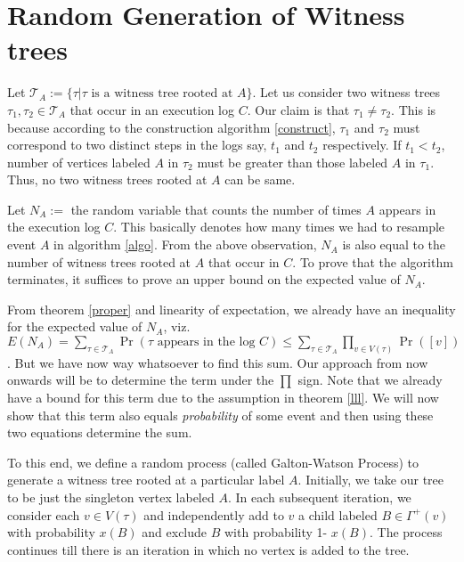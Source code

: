 \section{Random Generation of Witness trees}
Let $\mathcal{T}_A := \{\tau|\tau \text{ is a witness tree rooted at }A\} $. Let us consider two witness trees $\tau_1,\tau_2\in \mathcal{T}_A$ that occur in an execution log $C$. Our claim is that $\tau_1\neq\tau_2$. This is because according to the construction algorithm \ref{construct}, $\tau_1$ and $\tau_2$ must correspond to two distinct steps in the logs say, $t_1$ and  $t_2$ respectively. If $t_1 < t_2$, number of vertices labeled $A$ in $\tau_2$ must be greater than those labeled $A$ in $\tau_1$. Thus, no two witness trees rooted at $A$ can be same.

Let $N_A:=$ the random variable that counts the number of times $A$ appears in the execution log $C$. This basically denotes how many times we had to resample event $A$ in algorithm \ref{algo}. From the above observation, $N_A$ is also equal to the number of witness trees rooted at $A$ that occur in $C$. To prove that the algorithm terminates, it suffices to prove an upper bound on the expected value of $N_A$.

From theorem \ref{proper} and linearity of expectation, we already have an inequality for the expected value of $N_A$, viz. $E(N_A) = \sum\limits_{\tau\in\mathcal{T}_A} \Pr(\tau\text{ appears in the log }C) \leq \sum\limits_{\tau\in\mathcal{T}_A }\prod\limits_{v\in V(\tau)}\Pr([v]) $. But we have now way whatsoever to find this sum. Our approach from now onwards will be to determine the term under the $\prod$ sign. Note that we already have a bound for this term due to the assumption in theorem \ref{lll}. We will now show that this term also equals \emph{probability} of some event and then using these two equations determine the sum.

To this end, we define a random process (called Galton-Watson Process) to generate a witness tree rooted at a particular label $A$. Initially, we take our tree to be just the singleton vertex labeled $A$. In each subsequent iteration, we consider each $v\in V(\tau)$ and independently add to $v$ a child labeled $B \in\Gamma^+(v) $ with probability $x(B)$ and exclude $B$ with probability 1- $x(B) $. The process continues till there is an iteration in which no vertex is added to the tree.

